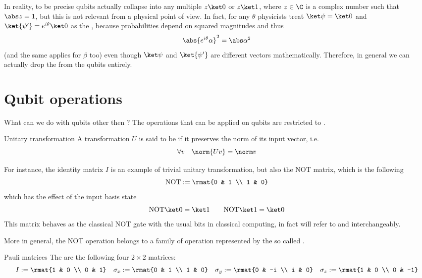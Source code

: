 \documentclass[a4paper, 12pt]{report}
\begin{document}
In reality, to be precise qubits actually collapse into any multiple $z \ket 0$ or $z\ket 1$, where $z \in \C$ is a complex number such that $\abs z = 1$, but this is not relevant from a physical point of view. In fact, for any $\theta$ physicists treat $\ket \psi = \ket 0$ and $\ket {\psi'} = e^{i \theta} \ket 0 $ as the , because probabilities depend on squared magnitudes and thus $$\abs{e^{i \theta} \alpha}^2 = \abs \alpha^2$$ (and the same applies for $\beta$ too) even though $\ket \psi$ and $\ket {\psi'}$ are different vectors mathematically. Therefore, in general we can actually drop the  from the qubits entirely.

\section{Qubit operations}

What can we do with qubits other then ? The operations that can be applied on qubits are restricted to .

\begin{frameddefn}{Unitary transformation}
	A transformation $U$ is said to be  if it preserves the norm of its input vector, i.e. $$\forall v \quad \norm{Uv} = \norm v$$
\end{frameddefn}

For instance, the identity matrix $I$ is an example of trivial unitary transformation, but also the NOT matrix, which is the following $$\mbox{NOT} := \rmat{0 & 1 \\ 1 & 0}$$ which has the effect of  the input basis state $$\mbox{NOT} \ket 0 = \ket 1 \quad \quad \mbox{NOT} \ket 1 = \ket 0$$ This matrix behaves as the classical NOT gate with the usual bits in classical computing, in fact will refer to  and  interchangeably.

More in general, the NOT operation belongs to a family of operation represented by the so called .

\begin{frameddefn}{Pauli matrices}
	The  are the following four $2 \times 2$ matrices: $$I := \rmat{1 & 0 \\ 0 & 1} \quad \sigma_x := \rmat{0 & 1 \\ 1 & 0} \quad \sigma_y := \rmat{0 & -i \\ i & 0} \quad \sigma_z := \rmat{1 & 0 \\ 0 & -1}$$
\end{frameddefn}
\end{document}
